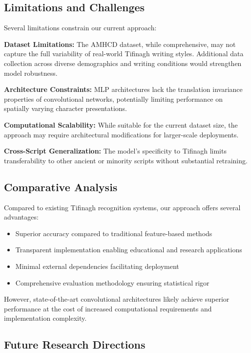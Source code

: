 \documentclass[12pt,a4paper]{article}
\begin{document}
	\subsection{Limitations and Challenges}
	
	Several limitations constrain our current approach:
	
	\textbf{Dataset Limitations:} The AMHCD dataset, while comprehensive, may not capture the full variability of real-world Tifinagh writing styles. Additional data collection across diverse demographics and writing conditions would strengthen model robustness.
	
	\textbf{Architecture Constraints:} MLP architectures lack the translation invariance properties of convolutional networks, potentially limiting performance on spatially varying character presentations.
	
	\textbf{Computational Scalability:} While suitable for the current dataset size, the approach may require architectural modifications for larger-scale deployments.
	
	\textbf{Cross-Script Generalization:} The model's specificity to Tifinagh limits transferability to other ancient or minority scripts without substantial retraining.
	
	\subsection{Comparative Analysis}
	
	Compared to existing Tifinagh recognition systems, our approach offers several advantages:
	\begin{itemize}
		\item Superior accuracy compared to traditional feature-based methods
		\item Transparent implementation enabling educational and research applications  
		\item Minimal external dependencies facilitating deployment
		\item Comprehensive evaluation methodology ensuring statistical rigor
	\end{itemize}
	
	However, state-of-the-art convolutional architectures likely achieve superior performance at the cost of increased computational requirements and implementation complexity.
	
	\subsection{Future Research Directions}
	
\end{document}
